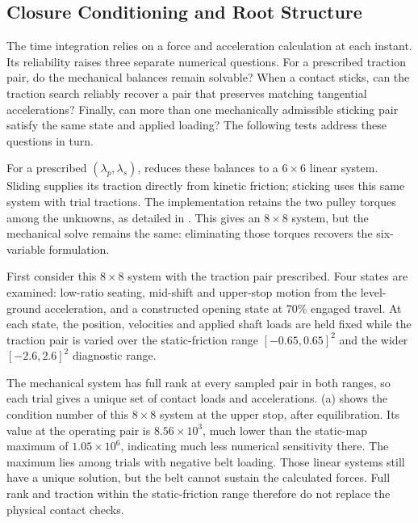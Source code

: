 \documentclass[11pt]{report}
\numberwithin{equation}{section}
\begin{document}
\subsection{Closure Conditioning and Root Structure}
\label{sec:results_closure_structure}

The time integration relies on a force and acceleration calculation at
each instant. Its reliability raises three separate numerical questions.
For a prescribed traction pair, do the mechanical balances remain solvable?
When a contact sticks, can the traction search reliably recover a pair that
preserves matching tangential accelerations? Finally, can more than one
mechanically admissible sticking pair satisfy the same state and applied
loading? The following tests address these questions in turn.

For a prescribed \((\lambda_p,\lambda_s)\),
 reduces these balances to a
\(6\times6\) linear system. Sliding supplies its traction directly from
kinetic friction; sticking uses this same system with trial tractions.
The implementation retains the two pulley torques among the unknowns,
as detailed in . This gives an \(8\times8\)
system, but the mechanical solve remains the same: eliminating those
torques recovers the six-variable formulation.

First consider this \(8\times8\) system with the traction pair prescribed.
Four states are examined: low-ratio seating, mid-shift and upper-stop motion
from the level-ground acceleration, and a constructed opening state at
\(70\%\) engaged travel. At each state, the position, velocities and
applied shaft loads are held fixed while the traction pair is varied over
the static-friction range \([-0.65,0.65]^2\) and the wider
\([-2.6,2.6]^2\) diagnostic range.

The mechanical system has full rank at every sampled pair in both ranges,
so each trial gives a unique set of contact loads and accelerations.
(a) shows the condition number
of this \(8\times8\) system at the upper stop, after equilibration.
Its value at the operating pair is \(8.56\times10^3\), much lower than
the static-map maximum of \(1.05\times10^6\), indicating much less
numerical sensitivity there. The maximum lies among trials with negative
belt loading. Those linear systems still have a unique solution, but the
belt cannot sustain the calculated forces. Full rank and traction within
the static-friction range therefore do not replace the physical contact
checks.
\end{document}
